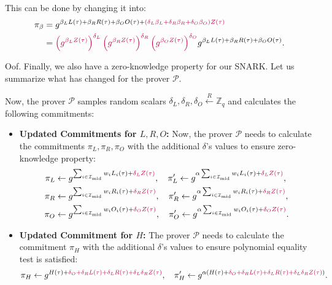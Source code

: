 \documentclass[../lecture-notes.tex]{subfiles}
\begin{document}
This can be done by changing it into:
\begin{align*}
    \pi_{\beta} &= g^{\beta_LL(\tau) + \beta_RR(\tau) + \beta_OO(\tau) + \textcolor{purple}{(\delta_L\beta_L + \delta_R\beta_R + \delta_O\beta_O)Z(\tau)}} \\&= \textcolor{purple}{\left(g^{\beta_L Z(\tau)}\right)^{\delta_L}\left(g^{\beta_R Z(\tau)}\right)^{\delta_R}\left(g^{\beta_O Z(\tau)}\right)^{\delta_O}}g^{\beta_LL(\tau) + \beta_RR(\tau) + \beta_OO(\tau)}.
\end{align*}

Oof. Finally, we also have a zero-knowledge property for our SNARK. Let us summarize what has changed for the prover $\mathcal{P}$.

\begin{proposition}
    Now, the prover $\mathcal{P}$ samples random scalars $\delta_L, \delta_R, \delta_O \xleftarrow{R} \mathbb{Z}_q$ and calculates the following commitments:
    \begin{itemize}
        \item \textbf{Updated Commitments for $L,R,O$:} Now, the prover $\mathcal{P}$ needs to calculate the commitments $\pi_L,\pi_R,\pi_O$ with the additional $\delta$'s values to ensure zero-knowledge property:
        \begin{align*}
            \pi_L &\gets g^{\sum_{i \in \mathcal{I}_{\text{mid}}}w_iL_i(\tau) + \textcolor{purple}{\delta_LZ(\tau)}}, \quad \pi_L' \gets g^{\alpha\sum_{i \in \mathcal{I}_{\text{mid}}}w_iL_i(\tau) + \textcolor{purple}{\delta_LZ(\tau)}}, \\
            \pi_R &\gets g^{\sum_{i \in \mathcal{I}_{\text{mid}}}w_iR_i(\tau) + \textcolor{purple}{\delta_RZ(\tau)}}, \quad \pi_R' \gets g^{\alpha\sum_{i \in \mathcal{I}_{\text{mid}}}w_iR_i(\tau) + \textcolor{purple}{\delta_RZ(\tau)}}, \\
            \pi_O &\gets g^{\sum_{i \in \mathcal{I}_{\text{mid}}}w_iO_i(\tau) + \textcolor{purple}{\delta_OZ(\tau)}}, \quad \pi_O' \gets g^{\alpha\sum_{i \in \mathcal{I}_{\text{mid}}}w_iO_i(\tau) + \textcolor{purple}{\delta_OZ(\tau)}}.
        \end{align*}
        \item \textbf{Updated Commitment for $H$:} The prover $\mathcal{P}$ needs to calculate the commitment $\pi_H$ with the additional $\delta$'s values to ensure polynomial equality test is satisfied:
        \begin{equation*}
            \pi_H \gets g^{H(\tau) + \textcolor{purple}{\delta_O + \delta_R L(\tau) + \delta_L R(\tau) + \delta_L \delta_R Z(\tau)}}, \quad \pi_H' \gets g^{\alpha(H(\tau) + \textcolor{purple}{\delta_O + \delta_R L(\tau) + \delta_L R(\tau) + \delta_L \delta_R Z(\tau)})}.

\end{equation*}
\end{itemize}
\end{proposition}
\end{document}
